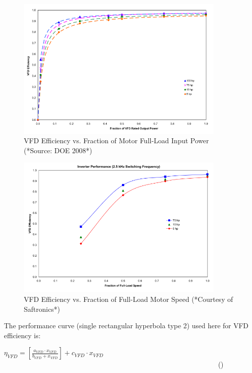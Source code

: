 \begin{figure}[hbtp] %
\centering
\includegraphics[width=0.9\textwidth, height=0.9\textheight, keepaspectratio=true]{media/image4923.svg.png}
\caption{VFD Efficiency vs. Fraction of Motor Full-Load Input Power (*Source: DOE 2008*) \protect \label{fig:vfd-efficiency-vs.-fraction-of-motor-full}}
\end{figure}

\begin{figure}[hbtp] %
\centering
\includegraphics[width=0.9\textwidth, height=0.9\textheight, keepaspectratio=true]{media/image4924.svg.png}
\caption{VFD Efficiency vs. Fraction of Full-Load Motor Speed (*Courtesy of Saftronics*) \protect \label{fig:vfd-efficiency-vs.-fraction-of-full-load}}
\end{figure}

The performance curve (single rectangular hyperbola type 2) used here for VFD efficiency is:

\({\eta_{VFD}} = \left[ {\frac{{{a_{VFD}} \cdot {x_{VFD}}}}{{{b_{VFD}} + {x_{VFD}}}}} \right] + {c_{VFD}} \cdot {x_{VFD}}\) ~~~~~~~~~~~~~~~~~~~~~~~~~~~~~~~~~~~~~~~~~~~~~~~~~~~~~~~~~~~~~ ()

